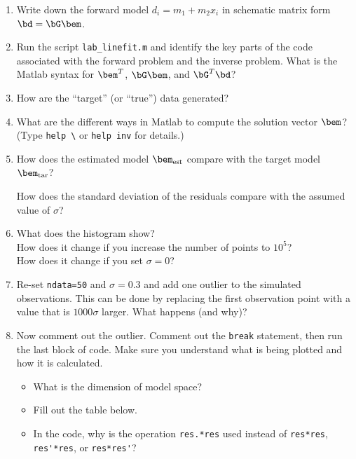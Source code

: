 \documentclass[11pt,titlepage,fleqn]{article}
\begin{document}
\begin{enumerate}
\item Write down the forward model $d_i = m_1 + m_2 x_i$ in schematic matrix form $\bd = \bG\bem$.

\vertgap
\vertgap

\item Run the script \verb+lab_linefit.m+ and identify the key parts of the code associated with the forward problem and the inverse problem. What is the Matlab syntax for $\bem^T$, $\bG\bem$, and $\bG^T\bd$?

\vertgap

\item How are the ``target'' (or ``true'') data generated?

\vertgap

\item What are the different ways in Matlab to compute the solution vector $\bem$? \\
(Type \verb+help \+ or \verb+help inv+ for details.)

\vertgap

\item How does the estimated model $\bem_{\rm est}$ compare with the target model $\bem_{\rm tar}$?

\vertgap

How does the standard deviation of the residuals compare with the assumed value of $\sigma$?

\vertgap

\item What does the histogram show? \\
How does it change if you increase the number of points to $10^5$? \\
How does it change if you set $\sigma = 0$?

\vertgap

\item Re-set \verb+ndata=50+ and $\sigma = 0.3$ and add one outlier to the simulated observations. This can be done by replacing the first observation point with a value that is $1000\sigma$ larger. What happens (and why)?

\vertgap

\pagebreak
\item Now comment out the outlier. Comment out the \verb+break+ statement, then run the last block of code. Make sure you understand what is being plotted and how it is calculated.
%
\begin{itemize}
\item What is the dimension of model space?
\item Fill out the table below.
\item In the code, why is the operation \verb+res.*res+ used instead of \verb+res*res+, \verb+res'*res+, or \verb+res*res'+?
\end{itemize}


\end{enumerate}
\end{document}
